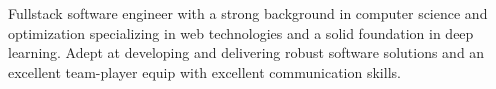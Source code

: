 \vspace{2mm}
\begin{flushleft}
	\begin{cvparagraph}
		Fullstack software engineer  with a strong background in computer science and optimization specializing in web technologies and a solid foundation in deep learning. Adept at developing and delivering robust software solutions and an excellent team-player equip with excellent communication skills.
	\end{cvparagraph}
\end{flushleft}
